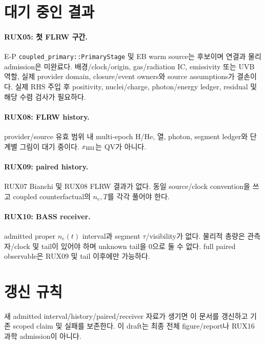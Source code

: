 \documentclass[11pt]{article}
\begin{document}
\section{대기 중인 결과}
\paragraph{RUX05: 첫 FLRW 구간.} E-P \texttt{coupled\_primary::PrimaryStage} 및 EB warm source는 후보이며 연결과 물리 admission은 미완료다. 배경/clock/origin, gas/radiation IC, emissivity 또는 UVB 역할, 실제 provider domain, closure/event owners와 source assumptions가 결손이다. 실제 RHS 주입 후 positivity, nuclei/charge, photon/energy ledger, residual 및 해당 수렴 검사가 필요하다.
\paragraph{RUX08: FLRW history.} provider/source 유효 범위 내 multi-epoch H/He, 열, photon, segment ledger와 단계별 그림이 대기 중이다. $x_{\rm HII}$는 QV가 아니다.
\paragraph{RUX09: paired history.} RUX07 Bianchi 및 RUX08 FLRW 결과가 없다. 동일 source/clock convention을 쓰고 coupled counterfactual의 $n_e,T$를 각각 풀어야 한다.
\paragraph{RUX10: BASS receiver.} admitted proper $n_e(t)$ interval과 segment $\tau$/visibility가 없다. 물리적 총량은 관측자/clock 및 tail이 있어야 하며 unknown tail을 0으로 둘 수 없다. full paired observable은 RUX09 및 tail 이후에만 가능하다.
\section{갱신 규칙}
새 admitted interval/history/paired/receiver 자료가 생기면 이 문서를 갱신하고 기존 scoped claim 및 실패를 보존한다. 이 draft는 최종 전체 figure/report나 RUX16 과학 admission이 아니다.
\end{document}
